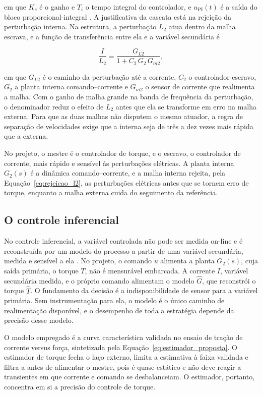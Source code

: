em que $K_c$ é o ganho e $T_i$ o tempo integral do controlador, e
$u_{\mathrm{PI}}(t)$ é a saída do bloco proporcional-integral
\cite{raffo_tcpi_pid2}. A justificativa da cascata está na rejeição da perturbação
interna. Na estrutura, a perturbação $L_2$ atua dentro da malha
escrava, e a função de transferência entre ela e a variável secundária é

\begin{equation}\label{eq:rejeicao_l2}
\frac{I}{L_2} = \frac{G_{L2}}{1 + C_2\,G_2\,G_{m2}},
\end{equation}

em que $G_{L2}$ é o caminho da perturbação até a corrente, $C_2$ o controlador
escravo, $G_2$ a planta interna comando--corrente e $G_{m2}$ o sensor de corrente que
realimenta a malha. Com o
ganho de malha grande na banda de frequência da perturbação, o denominador reduz o
efeito de $L_2$ antes que ela se transforme em erro na malha externa. Para que as duas
malhas não disputem o mesmo atuador, a regra de separação de velocidades exige que a
interna seja de três a dez vezes mais rápida que a externa.

No projeto, o mestre é o
controlador de torque, e o escravo, o controlador de corrente, mais rápido e sensível às
perturbações elétricas. A planta interna $G_2(s)$ é a dinâmica comando--corrente, e a
malha interna rejeita, pela Equação~\eqref{eq:rejeicao_l2}, as perturbações elétricas
antes que se tornem erro de torque, enquanto a malha externa cuida do seguimento da
referência.

\subsection{O controle inferencial}
\label{sec:inferencial}

No controle inferencial, a variável controlada não pode ser medida on-line e é
reconstruída por um modelo do processo a partir de uma variável secundária, medida e
sensível a ela \cite{raffo_tcpi_cascata}. No projeto, o comando $u$ alimenta a planta $G_2(s)$, cuja saída primária, o
torque $T$, não é mensurável embarcada. A corrente $I$, variável secundária medida, e o
próprio comando alimentam o modelo $\hat{G}$, que reconstrói o torque $\hat{T}$. O
fundamento da decisão é a indisponibilidade de sensor para a variável primária. Sem
instrumentação para ela, o modelo é o único caminho de realimentação disponível, e o
desempenho de toda a estratégia depende da precisão desse modelo.

O modelo empregado é a curva característica validada no ensaio de tração de
corrente versus força,
sintetizada pela
Equação~\eqref{eq:estimador_proposta}. O estimador de torque fecha o laço externo,
limita a estimativa à faixa validada e
filtra-a antes de alimentar o mestre, pois é quase-estático e não deve reagir a
transientes em que corrente e comando se desbalanceiam. O estimador, portanto,
concentra em si a precisão do controle de torque.


